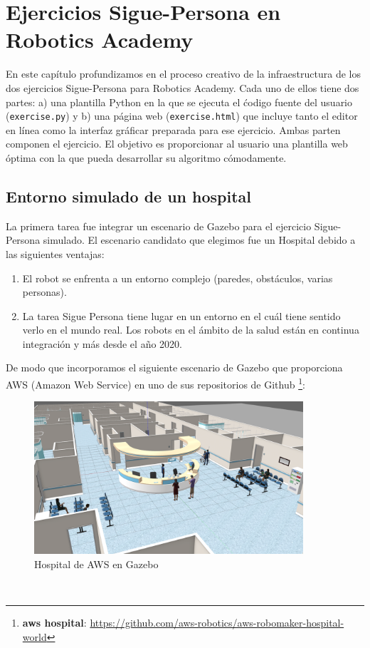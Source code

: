 \chapter{Ejercicios Sigue-Persona en Robotics Academy}
\label{cap:capitulo5}

En este capítulo profundizamos en el proceso creativo de la infraestructura de los dos ejercicios Sigue-Persona para Robotics Academy. Cada uno de ellos tiene dos partes: a) una plantilla Python en la que se ejecuta el ćodigo fuente del usuario (\texttt{exercise.py}) y b) una página web (\texttt{exercise.html}) que incluye tanto el editor en línea como la interfaz gráficar preparada para ese ejercicio. Ambas parten componen el ejercicio. El objetivo es proporcionar al usuario una plantilla web óptima con la que pueda desarrollar su algoritmo cómodamente.\\



\section{Entorno simulado de un hospital}
\label{sec:hospital_gazebo}

La primera tarea fue integrar un escenario de Gazebo para el ejercicio Sigue-Persona simulado. El escenario candidato que elegimos fue un Hospital debido a las siguientes ventajas:

\begin{enumerate}
	\item El robot se enfrenta a un entorno complejo (paredes, obstáculos, varias personas).
	\item La tarea Sigue Persona tiene lugar en un entorno en el cuál tiene sentido verlo en el mundo real. Los robots en el ámbito de la salud están en continua integración y más desde el año 2020.
\end{enumerate}

De modo que incorporamos el siguiente escenario de Gazebo que proporciona AWS (Amazon Web Service) en uno de sus repositorios de Github \footnote{\textbf{aws hospital}: \url{https://github.com/aws-robotics/aws-robomaker-hospital-world}}:\\

\begin{figure} [H]
  \begin{center}
    \includegraphics[width=10cm]{imagenes/cap5/hospital_world.png}
  \end{center}
  \caption[Hospital de AWS en Gazebo]{Hospital de AWS en Gazebo}
  \label{fig:hospital_gazebo}
\end{figure}\

